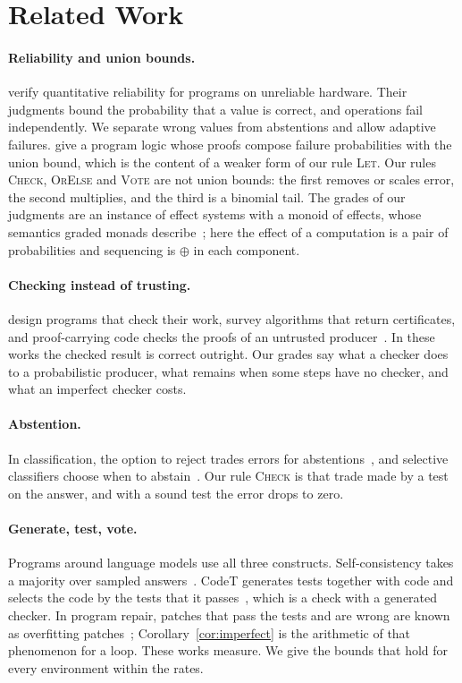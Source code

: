 \documentclass[acmsmall,nonacm,screen]{acmart}
\begin{document}
\section{Related Work}
\label{sec:related}

\paragraph{Reliability and union bounds.} \citet{carbin2013} verify quantitative reliability
for programs on unreliable hardware. Their judgments bound the probability that a value is
correct, and operations fail independently. We separate wrong values from abstentions and
allow adaptive failures. \citet{barthe2016} give a program logic whose proofs compose failure
probabilities with the union bound, which is the content of a weaker form of our rule
\textsc{Let}. Our rules \textsc{Check}, \textsc{OrElse} and \textsc{Vote} are not union
bounds: the first removes or scales error, the second multiplies, and the third is a
binomial tail. The grades of our judgments are an instance of effect systems with a monoid
of effects, whose semantics graded monads describe~\citep{katsumata2014}; here the effect of
a computation is a pair of probabilities and sequencing is $\oplus$ in each component.

\paragraph{Checking instead of trusting.} \citet{blum1995} design programs that check their
work, \citet{mcconnell2011} survey algorithms that return certificates, and proof-carrying
code checks the proofs of an untrusted producer~\citep{necula1997}. In these works the
checked result is correct outright. Our grades say what a checker does to a probabilistic
producer, what remains when some steps have no checker, and what an imperfect checker costs.

\paragraph{Abstention.} In classification, the option to reject trades errors for
abstentions~\citep{chow1970}, and selective classifiers choose when to
abstain~\citep{geifman2017}. Our rule \textsc{Check} is that trade made by a test on the
answer, and with a sound test the error drops to zero.

\paragraph{Generate, test, vote.} Programs around language models use all three constructs.
Self-consistency takes a majority over sampled answers~\citep{wang2022}. CodeT generates
tests together with code and selects the code by the tests that it passes~\citep{chen2022},
which is a check with a generated checker. In program repair, patches that pass the tests and are wrong are
known as overfitting patches~\citep{smith2015}; Corollary~\ref{cor:imperfect} is the
arithmetic of that phenomenon for a loop. These works measure. We give the bounds that hold
for every environment within the rates.
\end{document}
